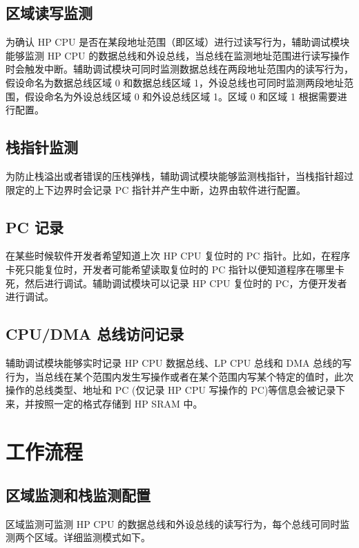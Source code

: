 \documentclass[main\_\_CN.tex]{subfiles}
\begin{document}
\subsection{区域读写监测}
为确认 HP CPU 是否在某段地址范围（即区域）进行过读写行为，辅助调试模块能够监测 HP CPU 的数据总线和外设总线，当总线在监测地址范围进行读写操作时会触发中断。辅助调试模块可同时监测数据总线在两段地址范围内的读写行为，假设命名为数据总线区域 0 和数据总线区域 1，外设总线也可同时监测两段地址范围，假设命名为外设总线区域 0 和外设总线区域 1。区域 0 和区域 1 根据需要进行配置。

\subsection{栈指针监测}
为防止栈溢出或者错误的压栈弹栈，辅助调试模块能够监测栈指针，当栈指针超过限定的上下边界时会记录 PC 指针并产生中断，边界由软件进行配置。

\subsection{PC 记录}
在某些时候软件开发者希望知道上次 HP CPU 复位时的 PC 指针。比如，在程序卡死只能复位时，开发者可能希望读取复位时的 PC 指针以便知道程序在哪里卡死，然后进行调试。辅助调试模块可以记录 HP CPU 复位时的 PC，方便开发者进行调试。

\subsection{CPU/DMA 总线访问记录}
辅助调试模块能够实时记录 HP CPU 数据总线、LP CPU 总线和 DMA 总线的写行为，当总线在某个范围内发生写操作或者在某个范围内写某个特定的值时，此次操作的总线类型、地址和 PC (仅记录 HP CPU 写操作的 PC)等信息会被记录下来，并按照一定的格式存储到 HP SRAM 中。

\section{工作流程}
\label{sec:dbgassist-recommended-operation}

\subsection{区域监测和栈监测配置}

区域监测可监测 HP CPU 的数据总线和外设总线的读写行为，每个总线可同时监测两个区域。详细监测模式如下。
\end{document}

